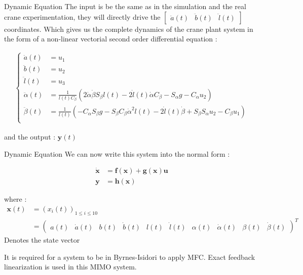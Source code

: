 \begin{frame}{Dynamic Equation}
 The input is be the same as in the simulation and the real crane experimentation, they will directly drive the \(\begin{bmatrix}\ddot{a}(t) & \ddot{b}(t) & \ddot{l}(t)\end{bmatrix}\) coordinates. Which gives us the complete dynamics of the crane plant system in the form of a non-linear vectorial second order differential equation \cite{Knierim2010Crane} : 


\begin{align}
\left\{ \begin{array}{ll}
\ddot{a}(t) &= u_1\\ 
\ddot{b}(t) &= u_2\\ 
\ddot{l}(t) &= u_3\\
\ddot{\alpha}(t) &= \frac{1}{l(t) C_{\beta}} \left(2 \dot{\alpha} \dot{\beta} S_{\beta} l(t) - 2 \dot{l}(t) \dot{\alpha} C_{\beta} - S_{\alpha} g - C_{\alpha} u_2\right) \\
\ddot{\beta}(t) &= \frac{1}{l(t)} \left(-C_{\alpha} S_{\beta} g - S_{\beta} C_{\beta} \dot{\alpha}^2 l(t) - 2 \dot{l}(t) \dot{\beta} + S_{\beta} S_{\alpha} u_2 - C_{\beta} u_1\right) \\
\end{array}
\right.
\end{align}

and the output :  \(\textbf{y}(t) \)

\end{frame}

\begin{frame}{Dynamic Equation}
 We can now write this system into the normal form : 

\begin{align*}
    \dot{\boldsymbol{x}} &= \boldsymbol{f}(\boldsymbol{x}) + \boldsymbol{g}(\boldsymbol{x})\boldsymbol{u} \\
     \boldsymbol{y}  &= \boldsymbol{h}(\boldsymbol{x})
\end{align*}

where : 
\begin{align*}
    \boldsymbol{x}(t) &= (x_i(t))_{1\le i\le 10} \\ &= \begin{pmatrix} a(t) & \dot{a}(t) & b(t) & \dot{b}(t) & l(t) & \dot{l}(t) & \alpha(t) & \dot{\alpha}(t) & \beta(t) & \dot{\beta}(t)\end{pmatrix}^T
\end{align*}
Denotes the state vector

It is required for a system to be in Byrnes-Isidori to apply MFC. Exact feedback linearization is used in this MIMO system.
\end{frame}

